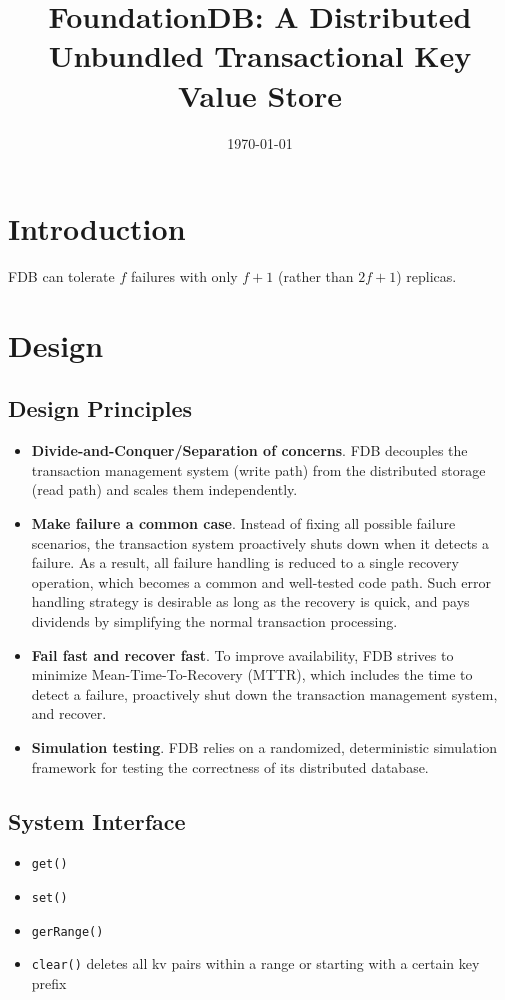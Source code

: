 \documentclass[11pt]{article}
\date{\today}
\title{FoundationDB: A Distributed Unbundled Transactional Key Value Store}
\begin{document}
\maketitle
\section{Introduction}
\label{sec:org58fff8a}
FDB can tolerate \(f\) failures with only \(f+1\) (rather than \(2f+1\)) replicas.
\section{Design}
\label{sec:org220c6b3}
\subsection{Design Principles}
\label{sec:org543fe46}
\begin{itemize}
\item \textbf{Divide-and-Conquer/Separation of concerns}. FDB decouples the transaction management system (write
path) from the distributed storage (read path) and scales them independently.
\item \textbf{Make failure a common case}. Instead of fixing all possible failure scenarios, the transaction system
proactively shuts down when it detects a failure. As a result, all failure handling is reduced to a
single recovery operation, which becomes a common and well-tested code path. Such error handling
strategy is desirable as long as the recovery is quick, and pays dividends by simplifying the normal
transaction processing.
\item \textbf{Fail fast and recover fast}. To improve availability, FDB strives to minimize Mean-Time-To-Recovery
(MTTR), which includes the time to detect a failure, proactively shut down the transaction
management system, and recover.
\item \textbf{Simulation testing}. FDB relies on a randomized, deterministic simulation framework for testing the
correctness of its distributed database.
\end{itemize}
\subsection{System Interface}
\label{sec:org367767f}
\begin{itemize}
\item \texttt{get()}
\item \texttt{set()}
\item \texttt{gerRange()}
\item \texttt{clear()} deletes all kv pairs within a range or starting with a certain key prefix
\end{itemize}
\end{document}

